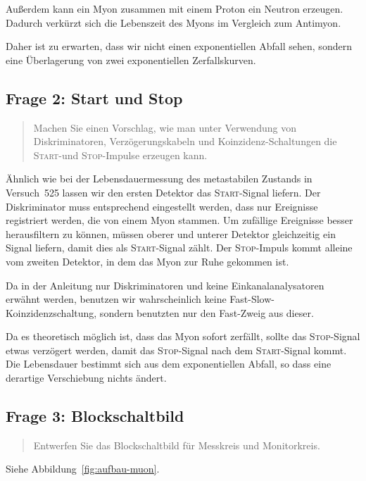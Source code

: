 \documentclass[11pt, ngerman, fleqn, DIV=15, headinclude, BCOR=2cm]{scrreprt}
\begin{document}
Außerdem kann ein Myon zusammen mit einem Proton ein Neutron erzeugen. Dadurch
verkürzt sich die Lebenszeit des Myons im Vergleich zum Antimyon.
\parencite{Rennie/Myon_Decay}

Daher ist zu erwarten, dass wir nicht einen exponentiellen Abfall sehen,
sondern eine Überlagerung von zwei exponentiellen Zerfallskurven.

\subsection{Frage 2: Start und Stop}

\begin{quote}
    Machen Sie einen Vorschlag, wie man unter Verwendung von Diskriminatoren,
    Verzögerungskabeln und Koinzidenz-Schaltungen die \textsc{Start}-und
    \textsc{Stop}-Impulse erzeugen kann.
\end{quote}

Ähnlich wie bei der Lebensdauermessung des metastabilen Zustands in Versuch~525
lassen wir den ersten Detektor das \textsc{Start}-Signal liefern. Der
Diskriminator muss entsprechend eingestellt werden, dass nur Ereignisse
registriert werden, die von einem Myon stammen. Um zufällige Ereignisse besser
herausfiltern zu können, müssen oberer und unterer Detektor gleichzeitig ein
Signal liefern, damit dies als \textsc{Start}-Signal zählt. Der
\textsc{Stop}-Impuls kommt alleine vom zweiten Detektor, in dem das Myon zur
Ruhe gekommen ist.

Da in der Anleitung nur Diskriminatoren und keine Einkanalanalysatoren erwähnt
werden, benutzen wir wahrscheinlich keine Fast-Slow-Koinzidenzschaltung,
sondern benutzten nur den Fast-Zweig aus dieser.

Da es theoretisch möglich ist, dass das Myon sofort zerfällt, sollte das
\textsc{Stop}-Signal etwas verzögert werden, damit das \textsc{Stop}-Signal
nach dem \textsc{Start}-Signal kommt. Die Lebensdauer bestimmt sich aus dem
exponentiellen Abfall, so dass eine derartige Verschiebung nichts ändert.

\subsection{Frage 3: Blockschaltbild}

\begin{quote}
    Entwerfen Sie das Blockschaltbild für Messkreis und Monitorkreis.
\end{quote}

Siehe Abbildung~\ref{fig:aufbau-muon}.
\end{document}
